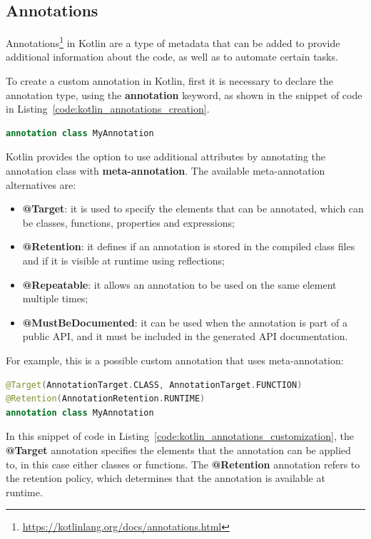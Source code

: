 \subsection{Annotations}\label{section:annotation}
Annotations\footnote{\url{https://kotlinlang.org/docs/annotations.html}} in Kotlin are a type of metadata that can be added to provide additional information about the code, as well as to automate certain tasks.

To create a custom annotation in Kotlin, first it is necessary to declare the annotation type, using the \textbf{annotation} keyword, as shown in the snippet of code in Listing~\ref{code:kotlin_annotations_creation}.
\begin{lstlisting}[caption={Example of creation of a custom annotation in Kotlin}, language=Kotlin, captionpos=b, label={code:kotlin_annotations_creation}]
annotation class MyAnnotation
\end{lstlisting}

Kotlin provides the option to use additional attributes by annotating the annotation class with \textbf{meta-annotation}. The available meta-annotation alternatives are:
\begin{itemize}
    \item \textbf{@Target}: it is used to specify the elements that can be annotated, which can be classes, functions, properties and expressions;
    \item \textbf{@Retention}: it defines if an annotation is stored in the compiled class files and if it is visible at runtime using reflections;
    \item \textbf{@Repeatable}: it allows an annotation to be used on the same element multiple times;
    \item \textbf{@MustBeDocumented}: it can be used when the annotation is part of a public API, and it must be included in the generated API documentation.
\end{itemize}

For example, this is a possible custom annotation that uses meta-annotation:
\begin{lstlisting}[caption={Example of custom annotation with meta-annotations in Kotlin}, language=Kotlin, captionpos=b, label={code:kotlin_annotations_customization}]
@Target(AnnotationTarget.CLASS, AnnotationTarget.FUNCTION)
@Retention(AnnotationRetention.RUNTIME)
annotation class MyAnnotation
\end{lstlisting}
In this snippet of code in Listing~\ref{code:kotlin_annotations_customization}, the \textbf{@Target} annotation specifies the elements that the annotation can be applied to, in this case either classes or functions. The \textbf{@Retention} annotation refers to the retention policy, which determines that the annotation is available at runtime.

